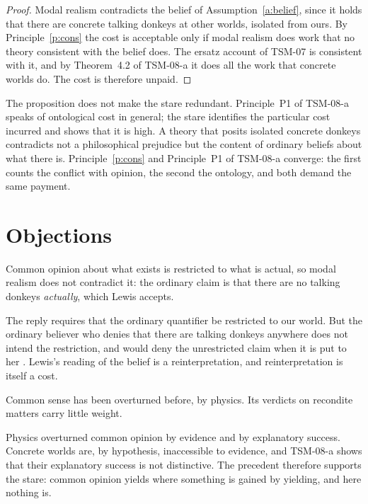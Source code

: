 \documentclass{situationist-preprint}
\begin{document}
\begin{proof}
Modal realism contradicts the belief of Assumption~\ref{a:belief}, since it holds that there are concrete talking donkeys at other worlds, isolated from ours. By Principle~\ref{p:cons} the cost is acceptable only if modal realism does work that no theory consistent with the belief does. The ersatz account of TSM-07 is consistent with it, and by Theorem~4.2 of TSM-08-a it does all the work that concrete worlds do. The cost is therefore unpaid.
\end{proof}

The proposition does not make the stare redundant. Principle~P1 of TSM-08-a speaks of ontological cost in general; the stare identifies the particular cost incurred and shows that it is high. A theory that posits isolated concrete donkeys contradicts not a philosophical prejudice but the content of ordinary beliefs about what there is. Principle~\ref{p:cons} and Principle~P1 of TSM-08-a converge: the first counts the conflict with opinion, the second the ontology, and both demand the same payment.

\section{Objections}

\begin{objection}
Common opinion about what exists is restricted to what is actual, so modal realism does not contradict it: the ordinary claim is that there are no talking donkeys \emph{actually}, which Lewis accepts.
\end{objection}

\begin{reply}
The reply requires that the ordinary quantifier be restricted to our world. But the ordinary believer who denies that there are talking donkeys anywhere does not intend the restriction, and would deny the unrestricted claim when it is put to her \citep[compare][]{Stalnaker1976}. Lewis's reading of the belief is a reinterpretation, and reinterpretation is itself a cost.
\end{reply}

\begin{objection}
Common sense has been overturned before, by physics. Its verdicts on recondite matters carry little weight.
\end{objection}

\begin{reply}
Physics overturned common opinion by evidence and by explanatory success. Concrete worlds are, by hypothesis, inaccessible to evidence, and TSM-08-a shows that their explanatory success is not distinctive. The precedent therefore supports the stare: common opinion yields where something is gained by yielding, and here nothing is.
\end{reply}
\end{document}
